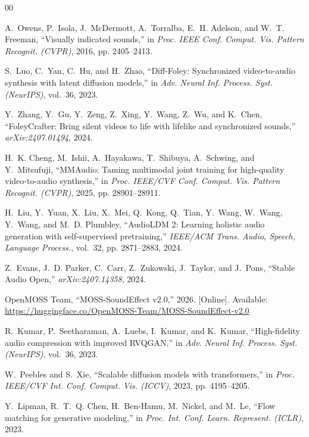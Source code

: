 \documentclass[conference]{IEEEtran}
\begin{document}
\begin{thebibliography}{00}

A.~Owens, P.~Isola, J.~McDermott, A.~Torralba, E.~H. Adelson, and W.~T. Freeman,
``Visually indicated sounds,'' in \emph{Proc. IEEE Conf. Comput. Vis. Pattern
Recognit. (CVPR)}, 2016, pp. 2405--2413.

S.~Luo, C.~Yan, C.~Hu, and H.~Zhao, ``Diff-Foley: Synchronized video-to-audio
synthesis with latent diffusion models,'' in \emph{Adv. Neural Inf. Process.
Syst. (NeurIPS)}, vol.~36, 2023.

Y.~Zhang, Y.~Gu, Y.~Zeng, Z.~Xing, Y.~Wang, Z.~Wu, and K.~Chen, ``FoleyCrafter:
Bring silent videos to life with lifelike and synchronized sounds,''
\emph{arXiv:2407.01494}, 2024.

H.~K. Cheng, M.~Ishii, A.~Hayakawa, T.~Shibuya, A.~Schwing, and Y.~Mitsufuji,
``MMAudio: Taming multimodal joint training for high-quality video-to-audio
synthesis,'' in \emph{Proc. IEEE/CVF Conf. Comput. Vis. Pattern Recognit.
(CVPR)}, 2025, pp. 28901--28911.

H.~Liu, Y.~Yuan, X.~Liu, X.~Mei, Q.~Kong, Q.~Tian, Y.~Wang, W.~Wang, Y.~Wang,
and M.~D. Plumbley, ``AudioLDM 2: Learning holistic audio generation with
self-supervised pretraining,'' \emph{IEEE/ACM Trans. Audio, Speech, Language
Process.}, vol.~32, pp. 2871--2883, 2024.

Z.~Evans, J.~D. Parker, C.~Carr, Z.~Zukowski, J.~Taylor, and J.~Pons, ``Stable
Audio Open,'' \emph{arXiv:2407.14358}, 2024.

OpenMOSS Team, ``MOSS-SoundEffect v2.0,'' 2026. [Online]. Available:
\url{https://huggingface.co/OpenMOSS-Team/MOSS-SoundEffect-v2.0}

R.~Kumar, P.~Seetharaman, A.~Luebs, I.~Kumar, and K.~Kumar, ``High-fidelity audio
compression with improved RVQGAN,'' in \emph{Adv. Neural Inf. Process. Syst.
(NeurIPS)}, vol.~36, 2023.

W.~Peebles and S.~Xie, ``Scalable diffusion models with transformers,'' in
\emph{Proc. IEEE/CVF Int. Conf. Comput. Vis. (ICCV)}, 2023, pp. 4195--4205.

Y.~Lipman, R.~T.~Q. Chen, H.~Ben-Hamu, M.~Nickel, and M.~Le, ``Flow matching for
generative modeling,'' in \emph{Proc. Int. Conf. Learn. Represent. (ICLR)}, 2023.


\end{thebibliography}
\end{document}
